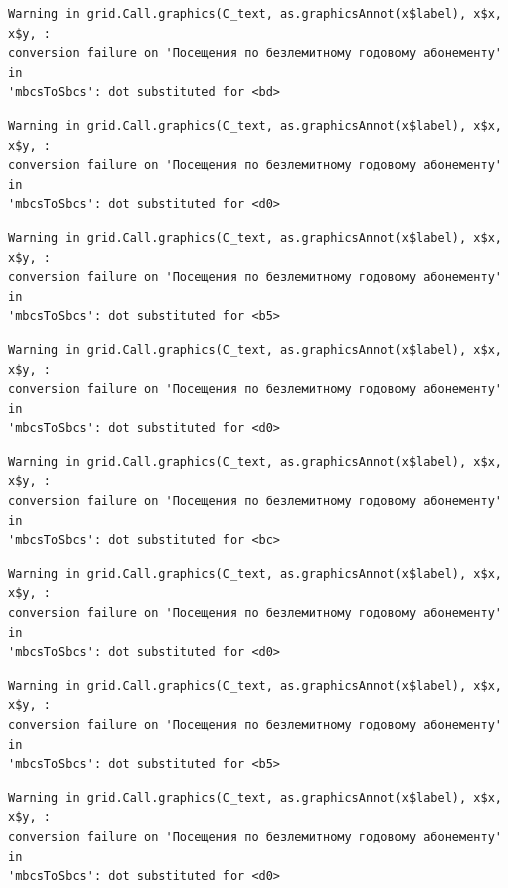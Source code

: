 \documentclass[
  letterpaper,
  DIV=11,
  numbers=noendperiod]{scrartcl}
\begin{document}
\begin{verbatim}
Warning in grid.Call.graphics(C_text, as.graphicsAnnot(x$label), x$x, x$y, :
conversion failure on 'Посещения по безлемитному годовому абонементу' in
'mbcsToSbcs': dot substituted for <bd>
\end{verbatim}

\begin{verbatim}
Warning in grid.Call.graphics(C_text, as.graphicsAnnot(x$label), x$x, x$y, :
conversion failure on 'Посещения по безлемитному годовому абонементу' in
'mbcsToSbcs': dot substituted for <d0>
\end{verbatim}

\begin{verbatim}
Warning in grid.Call.graphics(C_text, as.graphicsAnnot(x$label), x$x, x$y, :
conversion failure on 'Посещения по безлемитному годовому абонементу' in
'mbcsToSbcs': dot substituted for <b5>
\end{verbatim}

\begin{verbatim}
Warning in grid.Call.graphics(C_text, as.graphicsAnnot(x$label), x$x, x$y, :
conversion failure on 'Посещения по безлемитному годовому абонементу' in
'mbcsToSbcs': dot substituted for <d0>
\end{verbatim}

\begin{verbatim}
Warning in grid.Call.graphics(C_text, as.graphicsAnnot(x$label), x$x, x$y, :
conversion failure on 'Посещения по безлемитному годовому абонементу' in
'mbcsToSbcs': dot substituted for <bc>
\end{verbatim}

\begin{verbatim}
Warning in grid.Call.graphics(C_text, as.graphicsAnnot(x$label), x$x, x$y, :
conversion failure on 'Посещения по безлемитному годовому абонементу' in
'mbcsToSbcs': dot substituted for <d0>
\end{verbatim}

\begin{verbatim}
Warning in grid.Call.graphics(C_text, as.graphicsAnnot(x$label), x$x, x$y, :
conversion failure on 'Посещения по безлемитному годовому абонементу' in
'mbcsToSbcs': dot substituted for <b5>
\end{verbatim}

\begin{verbatim}
Warning in grid.Call.graphics(C_text, as.graphicsAnnot(x$label), x$x, x$y, :
conversion failure on 'Посещения по безлемитному годовому абонементу' in
'mbcsToSbcs': dot substituted for <d0>
\end{verbatim}
\end{document}
